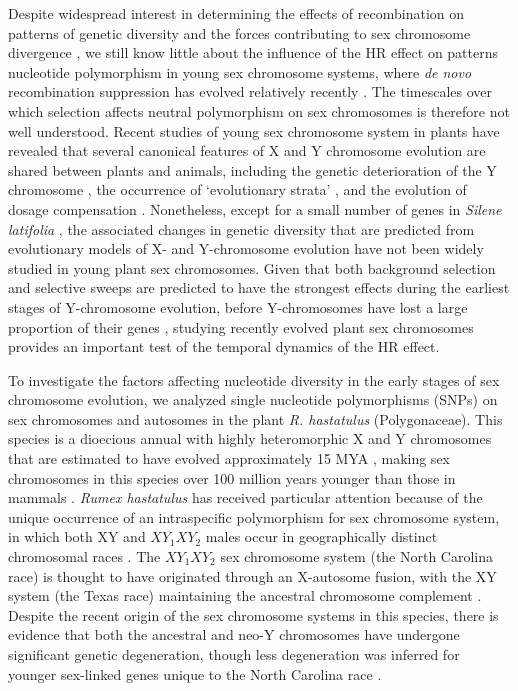 \documentclass[9pt,twocolumn,twoside]{gsajnl}
\begin{document}
Despite widespread interest in determining the effects of recombination on patterns of genetic diversity and the forces contributing to sex chromosome divergence \citep{ellegren2011,otto2011PAR,bachtrog2013NRG}, we still know little about the influence of the HR effect on patterns nucleotide polymorphism in young sex chromosome systems, where \textit{de novo} recombination suppression has evolved relatively recently \citep{charlesworth2016plant}. The timescales over which selection affects neutral polymorphism on sex chromosomes is therefore not well understood. Recent studies of young sex chromosome system in plants have revealed that several canonical features of X and Y chromosome evolution are shared between plants and animals, including the genetic deterioration of the Y chromosome \citep{bergero2015,hough2014}, the occurrence of ‘evolutionary strata’ \citep{bergero2009}, and the evolution of dosage compensation \citep{muyle2012,papadopulos2015}. Nonetheless, except for a small number of genes in \textit{Silene latifolia} \citep{filatov2001diversity,qiu2010nucleotide}, the associated changes in genetic diversity that are predicted from evolutionary models of X- and Y-chromosome evolution have not been widely studied in young plant sex chromosomes. Given that both background selection and selective sweeps are predicted to have the strongest effects during the earliest stages of Y-chromosome evolution, before Y-chromosomes have lost a large proportion of their genes \citep{bachtrog2008temporal}, studying recently evolved plant sex chromosomes provides an important test of the temporal dynamics of the HR effect.

To investigate the factors affecting nucleotide diversity in the early stages of sex chromosome evolution, we analyzed single nucleotide polymorphisms (SNPs) on sex chromosomes and autosomes in the plant \textit{R. hastatulus }(Polygonaceae). This species is a dioecious annual with highly heteromorphic X and Y chromosomes that are estimated to have evolved  approximately 15 MYA \citep{quesada2011,grabowska2015,navajas2005}, making sex chromosomes in this species over 100 million years younger than those in mammals \citep{lahn1999,ross2005dna}. \textit{Rumex hastatulus} has received particular attention because of the unique occurrence of an intraspecific polymorphism for sex chromosome system, in which both XY and $XY_{1}XY_{2}$ males occur in geographically distinct chromosomal races \citep{smith1963mechanism}. The $XY_{1}XY_{2}$ sex chromosome system (the North Carolina race) is thought to have originated through an X-autosome fusion, with the XY system (the Texas race) maintaining the ancestral chromosome complement \citep{smith1964evolving}. Despite the recent origin of the sex chromosome systems in this species, there is evidence that both the ancestral and neo-Y chromosomes have undergone significant genetic degeneration, though less degeneration was inferred for younger sex-linked genes unique to the North Carolina race \citep{hough2014}.
\end{document}

